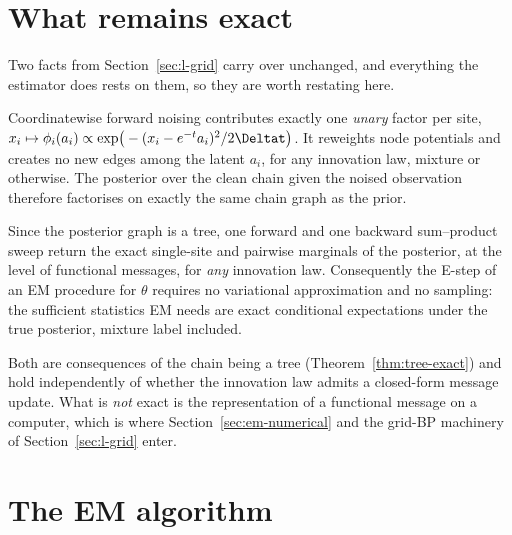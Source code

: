 \section{What remains exact}\label{sec:em-exact}

Two facts from Section~\ref{sec:l-grid} carry over unchanged, and everything
the estimator does rests on them, so they are worth restating here.

\begin{proposition}
\label{prop:em-unary}
Coordinatewise forward noising contributes exactly one \emph{unary} factor per
site, $x_i \mapsto \phi_i(a_i) \propto \exp\!\big(-(x_i-e^{-t}a_i)^2/2\Deltat\big)$.
It reweights node potentials and creates no new edges among the latent
$a_i$, for any innovation law, mixture or otherwise. The posterior over the
clean chain given the noised observation therefore factorises on exactly the
same chain graph as the prior.
\end{proposition}

\begin{proposition}\label{prop:em-estep}
Since the posterior graph is a tree, one forward and one backward
sum--product sweep return the exact single-site and pairwise marginals of the
posterior, at the level of functional messages, for \emph{any} innovation
law. Consequently the E-step of an EM procedure for $\theta$ requires no
variational approximation and no sampling: the sufficient statistics EM needs
are exact conditional expectations under the true posterior, mixture label
included.
\end{proposition}

Both are consequences of the chain being a tree (Theorem~\ref{thm:tree-exact})
and hold independently of whether the innovation law admits a closed-form
message update. What is \emph{not} exact is the representation of a functional
message on a computer, which is where Section~\ref{sec:em-numerical} and the
grid-BP machinery of Section~\ref{sec:l-grid} enter.

\section{The EM algorithm}\label{sec:em-algorithm}

